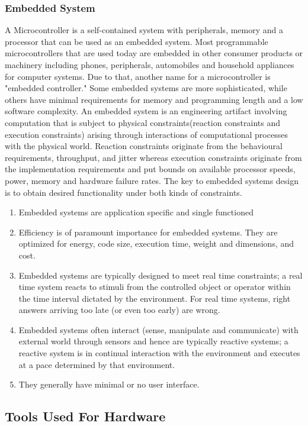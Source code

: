 \documentclass[12pt, a4paper]{article}
\begin{document}
\subsubsection{Embedded System}
A Microcontroller is a self-contained system with peripherals, memory and a processor that can be used as an embedded system. Most programmable microcontrollers that are used today are embedded in other consumer products or machinery including phones, peripherals, automobiles and household appliances for computer systems. Due to that, another name for a microcontroller is "embedded controller." Some embedded systems are more sophisticated, while others have minimal requirements for memory and programming length and a low software complexity. An embedded system is an engineering artifact involving computation that is subject to physical constraints(reaction constraints and execution constraints) arising through interactions of computational processes with the physical world. Reaction constraints originate from the behavioural requirements, throughput, and jitter whereas execution constraints originate from the implementation requirements and put bounds on available processor speeds, power, memory and hardware failure rates. The key to embedded systems design is to obtain desired functionality under both kinds of constraints. 

\begin{enumerate}
\item Embedded systems are application specific and single functioned
\item Efficiency is of paramount importance for embedded systems. They are optimized for energy, code size, execution time, weight and dimensions, and cost.
\item Embedded systems are typically designed to meet real time constraints; a real time system reacts to stimuli from the controlled object or operator within the time interval dictated by the environment. For real time systems, right answers arriving too late (or even too early) are wrong.
\item Embedded systems often interact (sense, manipulate and communicate) with external world through sensors and hence are typically reactive systems; a reactive system is in continual interaction with the environment and executes at a pace determined by that environment.
\item They generally have minimal or no user interface. 
\end{enumerate}

\subsection{Tools Used For Hardware}
\end{document}
